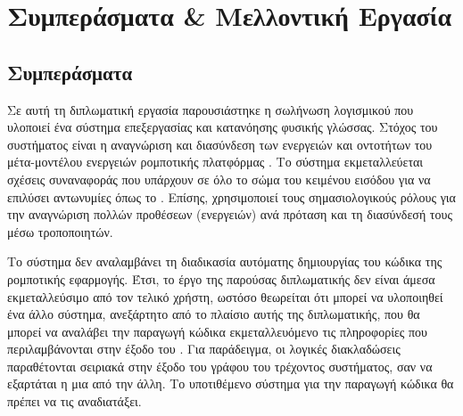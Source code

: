\chapter{Συμπεράσματα \& Μελλοντική Εργασία}\label{chap:conclusions_future}

\section{Συμπεράσματα}
Σε αυτή τη διπλωματική εργασία παρουσιάστηκε η σωλήνωση λογισμικού \projectname{} που υλοποιεί ένα σύστημα επεξεργασίας και κατανόησης φυσικής γλώσσας.
Στόχος του συστήματος είναι η αναγνώριση και διασύνδεση των ενεργειών και οντοτήτων του μέτα-μοντέλου ενεργειών ρομποτικής πλατφόρμας \metamodel{}.
Το σύστημα εκμεταλλεύεται σχέσεις συναναφοράς που υπάρχουν σε όλο το σώμα του κειμένου εισόδου για να επιλύσει αντωνυμίες όπως το .
Επίσης, χρησιμοποιεί τους σημασιολογικούς ρόλους για την αναγνώριση πολλών προθέσεων (ενεργειών) ανά πρόταση και τη διασύνδεσή τους μέσω τροποποιητών.

Το σύστημα δεν αναλαμβάνει τη διαδικασία αυτόματης δημιουργίας του κώδικα της ρομποτικής εφαρμογής.
Έτσι, το έργο της παρούσας διπλωματικής δεν είναι άμεσα εκμεταλλεύσιμο από τον τελικό χρήστη,
ωστόσο θεωρείται ότι μπορεί να υλοποιηθεί ένα άλλο σύστημα, ανεξάρτητο από το πλαίσιο αυτής της διπλωματικής, που θα μπορεί να αναλάβει την παραγωγή κώδικα εκμεταλλευόμενο τις πληροφορίες που περιλαμβάνονται στην έξοδο του \projectname{}.
Για παράδειγμα, οι λογικές διακλαδώσεις  παραθέτονται σειριακά στην έξοδο του γράφου του τρέχοντος συστήματος, σαν να εξαρτάται η μια από την άλλη.
Το υποτιθέμενο σύστημα για την παραγωγή κώδικα θα πρέπει να τις αναδιατάξει.

